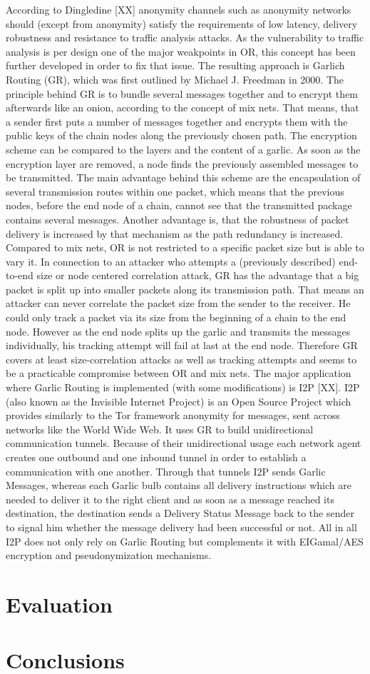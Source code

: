 \documentclass{sig-alternate}
\begin{document}
According to Dingledine [XX] anonymity channels such as anonymity networks should (except from anonymity) satisfy the requirements of low latency, delivery robustness and resistance to traffic analysis attacks. As the vulnerability to traffic analysis is per design one of the major weakpoints in OR, this concept has been further developed in order to fix that issue. The resulting approach is Garlich Routing (GR), which was first outlined by Michael J. Freedman in 2000. The principle behind GR is to bundle several messages together and to encrypt them afterwards like an onion, according to the concept of mix nets. That means, that a sender first puts a number of messages together and encrypts them with the public keys of the chain nodes along the previously chosen path. The encryption scheme can be compared to the layers and the content of a garlic. As soon as the encryption layer are removed, a node finds the previously assembled messages to be transmitted. The main advantage behind this scheme are the encapsulation of several transmission routes within one packet, which means that the previous nodes, before the end node of a chain, cannot see that the transmitted package contains several messages. Another advantage is, that the robustness of packet delivery is increased by that mechanism as the path redundancy is increased. Compared to mix nets, OR is not restricted to a specific packet size but is able to vary it. In connection to an attacker who attempts a (previously described) end-to-end size or node centered correlation attack, GR has the advantage that a big packet is split up into smaller packets along its transmission path. That means an attacker can never correlate the packet size from the sender to the receiver. He could only track a packet via its size from the beginning of a chain to the end node. However as the end node splits up the garlic and transmits the messages individually, his tracking attempt will fail at last at the end node. Therefore GR covers at least size-correlation attacks as well as tracking attempts and seems to be a practicable compromise between OR and mix nets. The major application where Garlic Routing is implemented (with some modifications) is I2P [XX]. I2P (also known as the Invisible Internet Project) is an Open Source Project which provides similarly to the Tor framework anonymity for messages, sent across networks like the World Wide Web. It uses GR to build unidirectional communication tunnels. Because of their unidirectional usage each network agent creates one outbound and one inbound tunnel in order to establish a communication with one another. Through that tunnels I2P sends Garlic Messages, whereas each Garlic bulb contains all delivery instructions which are needed to deliver it to the right client and as soon as a message reached its destination, the destination sends a Delivery Status Message back to the sender to signal him whether the message delivery had been successful or not. All in all I2P does not only rely on Garlic Routing but complements it with EIGamal/AES encryption and pseudonymization mechanisms. 

\section{Evaluation}

\section{Conclusions}



\end{document}
